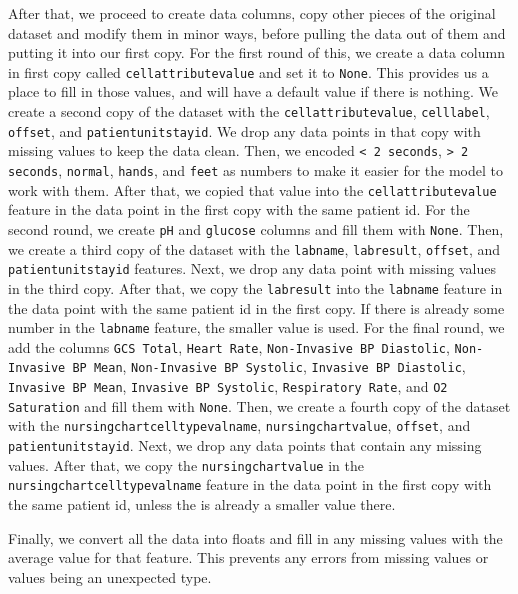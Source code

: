 \documentclass{article}
\begin{document}
After that, we proceed to create data columns, copy other pieces of the original dataset and modify them in minor ways, before pulling the data out of them and putting it into our first copy. For the first round of this, we create a data column in first copy called \texttt{cellattributevalue} and set it to \texttt{None}. This provides us a place to fill in those values, and will have a default value if there is nothing. We create a second copy of the dataset with the \texttt{cellattributevalue}, \texttt{celllabel}, \texttt{offset}, and \texttt{patientunitstayid}. We drop any data points in that copy with missing values to keep the data clean. Then, we encoded \texttt{< 2 seconds}, \texttt{> 2 seconds}, \texttt{normal}, \texttt{hands}, and \texttt{feet} as numbers to make it easier for the model to work with them. After that, we copied that value into the \texttt{cellattributevalue} feature in the data point in the first copy with the same patient id. For the second round, we create \texttt{pH} and \texttt{glucose} columns and fill them with \texttt{None}. Then, we create a third copy of the dataset with the \texttt{labname}, \texttt{labresult}, \texttt{offset}, and \texttt{patientunitstayid} features. Next, we drop any data point with missing values in the third copy. After that, we copy the \texttt{labresult} into the \texttt{labname} feature in the data point with the same patient id in the first copy. If there is already some number in the \texttt{labname} feature, the smaller value is used. For the final round, we add the columns \texttt{GCS Total}, \texttt{Heart Rate}, \texttt{Non-Invasive BP Diastolic}, \texttt{Non-Invasive BP Mean}, \texttt{Non-Invasive BP Systolic}, \texttt{Invasive BP Diastolic}, \texttt{Invasive BP Mean}, \texttt{Invasive BP Systolic}, \texttt{Respiratory Rate}, and \texttt{O2 Saturation} and fill them with \texttt{None}. Then, we create a fourth copy of the dataset with the \texttt{nursingchartcelltypevalname}, \texttt{nursingchartvalue}, \texttt{offset}, and \texttt{patientunitstayid}. Next, we drop any data points that contain any missing values. After that, we copy the \texttt{nursingchartvalue} in the \texttt{nursingchartcelltypevalname} feature in the data point in the first copy with the same patient id, unless the is already a smaller value there. 

Finally, we convert all the data into floats and fill in any missing values with the average value for that feature. This prevents any errors from missing values or values being an unexpected type. 
\end{document}
